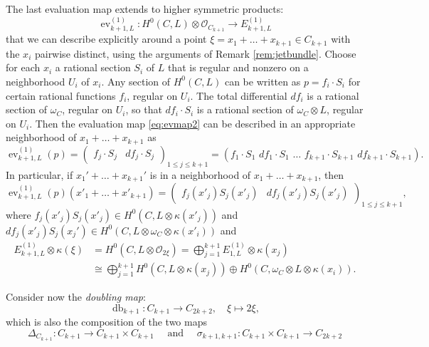 \documentclass[12pt]{amsart}
\numberwithin{equation}{section}
\numberwithin{thmcounter}{section}
\theoremstyle{definition}
\theoremstyle{claim}
\newcommand{\sO}{\mathscr{O}}
\begin{document}
The last evaluation map extends to higher symmetric products:
\begin{equation}\label{eq:evmap2}
\operatorname{ev}^{(1)}_{k+1,L}\colon H^0(C,L)\otimes \sO_{C_{k+1}} \longrightarrow E^{(1)}_{k+1,L}
\end{equation}
that we can describe explicitly around a point  $\xi=x_1+\dots+x_{k+1} \in C_{k+1}$ with the $x_i$ pairwise distinct, using the arguments of Remark \ref{rem:jetbundle}.  Choose for each $x_i$ a rational section $S_i$ of $L$ that is regular and nonzero on a neighborhood $U_i$ of $x_i$. Any section of $H^0(C,L)$ can be written as  $p = f_i\cdot S_i$ for certain rational functions $f_i$, regular on $U_i$. The total differential $df_i$ is a rational section of $\omega_C$, regular on $U_i$, so that $df_i\cdot S_i$ is a rational section of $\omega_C\otimes L$, regular on $U_i$.
 Then the evaluation map \eqref{eq:evmap2} can be described in an appropriate neighborhood of $x_1+\dots+x_{k+1}$ as
\[ \operatorname{ev}^{(1)}_{k+1,L}(p) = \begin{pmatrix} f_j\cdot S_j & df_j\cdot S_j \end{pmatrix}_{1\leq j \leq k+1} = (f_1 \cdot S_1 \,\, df_1 \cdot S_1 \,\, \ldots \,\, f_{k+1}\cdot S_{k+1} \,\, df_{k+1}\cdot S_{k+1}) . \]
In particular, if  $x_1'+\dots+x_{k+1}'$ is in a neighborhood of $x_1+\dots+x_{k+1}$, then
\[ \operatorname{ev}^{(1)}_{k+1,L}(p)(x'_1+\dots+x'_{k+1}) = \begin{pmatrix} f_j(x'_j)S_j(x'_j) & df_j(x'_j)S_j(x'_j) \end{pmatrix}_{1\leq j \leq k+1},  \]
where $f_j(x'_j)S_j(x'_j) \in H^0(C,L\otimes \kappa(x'_j))$ and $df_j(x'_j)S_j(x_j') \in H^0(C,L\otimes \omega_C\otimes \kappa(x'_i))$ and
\begin{align*}
E^{(1)}_{k+1,L}\otimes \kappa(\xi) &= H^0(C,L\otimes \sO_{2\xi}) = \bigoplus_{j=1}^{k+1} E^{(1)}_{1,L} \otimes \kappa(x_j) \\
&\cong  \bigoplus_{j=1}^{k+1} H^0(C,L\otimes \kappa(x_j)) \oplus H^0(C,\omega_C\otimes L\otimes \kappa(x_i)).
\end{align*}

Consider now the \emph{doubling map}:
\begin{equation}\label{eq:doublingmap}
	\operatorname{db}_{k+1}\colon C_{k+1} \longrightarrow C_{2k+2}, \quad \xi \longmapsto 2\xi, 
\end{equation}
which is also the composition of the two maps
\[ \Delta_{C_{k+1}}\colon C_{k+1} \longrightarrow C_{k+1}\times C_{k+1} \quad \text{ and } \quad \sigma_{k+1,k+1}\colon C_{k+1}\times C_{k+1} \longrightarrow C_{2k+2} \]
\end{document}
